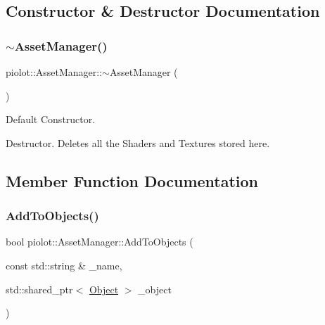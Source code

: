 \subsection{Constructor \& Destructor Documentation}
\mbox{\label{classpiolot_1_1_asset_manager_a49967e4909436ff8ebaeadf08db4ebc7}} 
\subsubsection{\texorpdfstring{$\sim$\+Asset\+Manager()}{~AssetManager()}}
{\footnotesize\ttfamily piolot\+::\+Asset\+Manager\+::$\sim$\+Asset\+Manager (\begin{DoxyParamCaption}{ }\end{DoxyParamCaption})\hspace{0.3cm}{\ttfamily [inline]}}



Default Constructor. 

Destructor. Deletes all the Shaders and Textures stored here. 

\subsection{Member Function Documentation}
\mbox{\label{classpiolot_1_1_asset_manager_abfad75fa1cde6d1ecd77fbdf297a80b0}} 
\subsubsection{\texorpdfstring{Add\+To\+Objects()}{AddToObjects()}}
{\footnotesize\ttfamily bool piolot\+::\+Asset\+Manager\+::\+Add\+To\+Objects (\begin{DoxyParamCaption}\item[{const std\+::string \&}]{\+\_\+name,  }\item[{std\+::shared\+\_\+ptr$<$ \mbox{\hyperlink{classpiolot_1_1_object}{Object}} $>$}]{\+\_\+object }\end{DoxyParamCaption})\hspace{0.3cm}{\ttfamily [inline]}}

